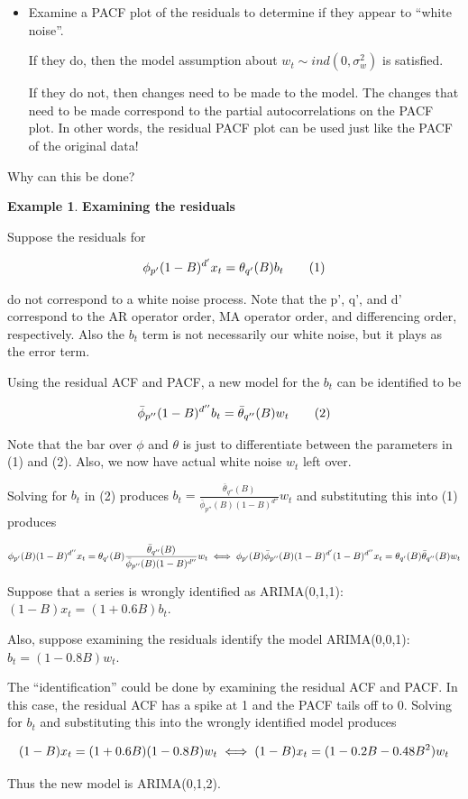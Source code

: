 \documentclass[
]{book}
\theoremstyle{definition}
\theoremstyle{definition}
\newtheorem{example}{Example}[chapter]
\theoremstyle{definition}
\theoremstyle{definition}
\theoremstyle{remark}
\begin{document}
\begin{itemize}
\item
  Examine a PACF plot of the residuals to determine if they appear to ``white noise''.

  If they do, then the model assumption about \(w_t \sim ind (0,\sigma_w^2)\) is satisfied.

  If they do not, then changes need to be made to the model. The changes that need to be made correspond to the partial autocorrelations on the PACF plot. In other words, the residual PACF plot can be used just like the PACF of the original data!
\end{itemize}

Why can this be done?

\begin{example}
\textbf{Examining the residuals}

Suppose the residuals for

\[\phi_{p'}(1-B)^{d'}x_t=\theta_{q'}(B)b_t \tag 1\]

do not correspond to a white noise process. Note that the p', q', and d' correspond to the AR operator order, MA operator order, and differencing order, respectively. Also the \(b_t\) term is not necessarily our white noise, but it plays as the error term.

Using the residual ACF and PACF, a new model for the \(b_t\) can be identified to be

\[\bar \phi_{p''}(1-B)^{d''}b_t=\bar \theta_{q''}(B)w_t \tag 2\]

Note that the bar over \(\phi\) and \(\theta\) is just to differentiate between the parameters in (1) and (2). Also, we now have actual white noise \(w_t\) left over.

Solving for \(b_t\) in (2) produces \(b_t=\frac{\bar \theta_{q''}(B)}{\bar \phi_{p''}(B)(1-B)^{d''}}w_t\) and substituting this into (1) produces

\[\phi_{p'}(B)(1-B)^{d''}x_t=\theta_{q'}(B)\frac{\bar \theta_{q''}(B)}{\bar \phi_{p''}(B)(1-B)^{d''}}w_t \\
\iff \phi_{p'}(B)\bar\phi_{p''}(B)(1-B)^{d'}(1-B)^{d''}x_t=\theta_{q'}(B)\bar\theta_{q''}(B)w_t\]

Suppose that a series is wrongly identified as ARIMA(0,1,1): \((1-B)x_t=(1+0.6B)b_t\).

Also, suppose examining the residuals identify the model ARIMA(0,0,1):\(b_t=(1-0.8B)w_t\).

The ``identification'' could be done by examining the residual ACF and PACF. In this case, the residual ACF has a spike at 1 and the PACF tails off to 0. Solving for \(b_t\) and substituting this into the wrongly identified model produces

\[(1-B)x_t=(1+0.6B)(1-0.8B)w_t\\
\iff (1-B)x_t=(1-0.2B-0.48B^2)w_t\]

Thus the new model is ARIMA(0,1,2).
\end{example}
\end{document}
